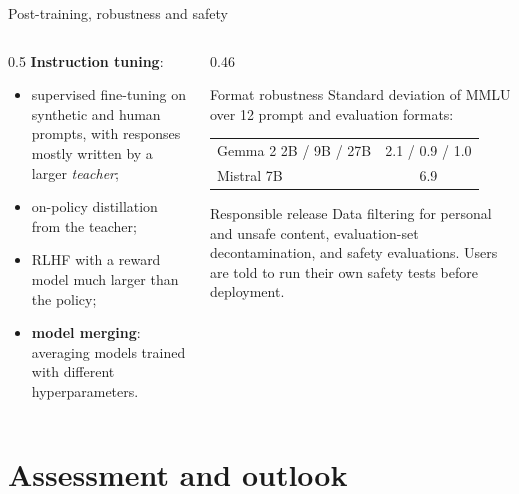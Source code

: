 \documentclass[aspectratio=169,11pt]{beamer}
\begin{document}
\begin{frame}{Post-training, robustness and safety}
  \begin{columns}[T]
    \begin{column}{0.5\textwidth}
      \small
      \textbf{Instruction tuning}:
      \begin{itemize}
        \item supervised fine-tuning on synthetic and human prompts, with responses mostly written by a larger \emph{teacher};
        \item on-policy distillation from the teacher;
        \item RLHF with a reward model much larger than the policy;
        \item \textbf{model merging}: averaging models trained with different hyperparameters.
      \end{itemize}
    \end{column}
    \begin{column}{0.46\textwidth}
      \begin{block}{Format robustness}
        \small
        Standard deviation of MMLU over 12 prompt and evaluation formats:
        \vspace{1mm}

        \begin{tabular}{@{}lc@{}}
          \toprule
          Gemma 2 2B / 9B / 27B & 2.1 / 0.9 / 1.0\\
          Mistral 7B & 6.9\\
          \bottomrule
        \end{tabular}
      \end{block}
      \begin{alertblock}{Responsible release}
        \small
        Data filtering for personal and unsafe content, evaluation-set decontamination, and safety evaluations. Users are told to run their own safety tests before deployment.
      \end{alertblock}
    \end{column}
  \end{columns}
\end{frame}

\section{Assessment and outlook}
\end{document}
